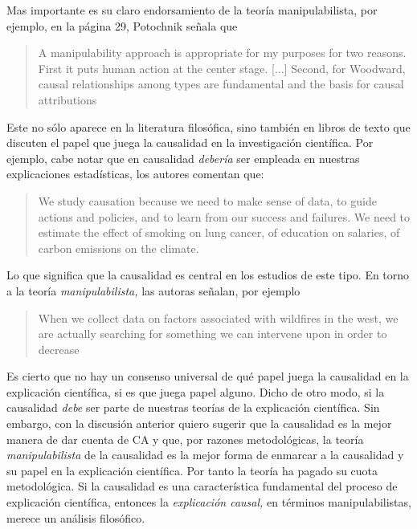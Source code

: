 {{Mas importante es su claro endorsamiento de la teoría
manipulabilista, por ejemplo, en la página 29, Potochnik
señala que


\begin{quote}
  A manipulability approach is appropriate for my purposes for
  two reasons. First it puts human action at the center stage.
  [$\ldots$] Second, for Woodward, causal relationships among
  types are fundamental and the basis for causal attributions
\end{quote}

Este  no sólo aparece
en la literatura filosófica, sino también en libros de texto
que discuten el papel que juega la causalidad en la
investigación científica. Por ejemplo, cabe notar que en
causalidad \emph{debería} ser empleada en nuestras
explicaciones estadísticas, los autores comentan que:

	\begin{quote}
    We study causation because we need to make sense of
    data, to guide actions and policies, and to learn from
    our success and failures. We need to estimate the effect
    of smoking on lung cancer, of education on salaries, of
    carbon emissions on the climate.
	\end{quote}

Lo que significa que la causalidad es central en
los estudios de este tipo. En torno a la teoría
\emph{manipulabilista,} las autoras señalan, por ejemplo

	\begin{quote}
	  When we collect data on factors associated with
    wildfires in the west, we are actually searching for
    something we can intervene upon in order to decrease
	\end{quote}

Es cierto que no hay un consenso universal de qué papel
juega la causalidad en la explicación científica, si es que
juega papel alguno. Dicho de otro modo, si la causalidad
\emph{debe} ser parte de nuestras teorías de la
explicación científica. Sin embargo, con la discusión
anterior quiero sugerir que la causalidad es la mejor manera
de dar cuenta de CA y que, por razones metodológicas, la
teoría \emph{manipulabilista} de la causalidad es la mejor
forma de enmarcar a la causalidad y su papel en la
explicación científica. Por tanto la teoría ha pagado su
cuota metodológica. Si la causalidad es una característica
fundamental del proceso de explicación científica, entonces
la \emph{explicación causal,} en términos manipulabilistas,
merece un análisis filosófico.

}}
